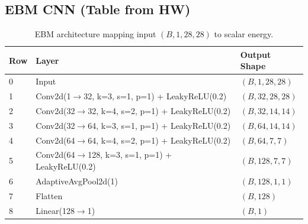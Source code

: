 \documentclass[a4paper,12pt]{article}
\begin{document}
\subsection{EBM CNN (Table from HW)}
\begin{table}[H]
\centering
\caption{EBM architecture mapping input $(B,1,28,28)$ to scalar energy.}
\begin{tabular}{lll}
\toprule
Row & Layer & Output Shape \\
\midrule
0 & Input & $(B,1,28,28)$ \\
1 & Conv2d(1$\rightarrow$32, k=3, s=1, p=1) + LeakyReLU(0.2) & $(B,32,28,28)$ \\
2 & Conv2d(32$\rightarrow$32, k=4, s=2, p=1) + LeakyReLU(0.2) & $(B,32,14,14)$ \\
3 & Conv2d(32$\rightarrow$64, k=3, s=1, p=1) + LeakyReLU(0.2) & $(B,64,14,14)$ \\
4 & Conv2d(64$\rightarrow$64, k=4, s=2, p=1) + LeakyReLU(0.2) & $(B,64,7,7)$ \\
5 & Conv2d(64$\rightarrow$128, k=3, s=1, p=1) + LeakyReLU(0.2) & $(B,128,7,7)$ \\
6 & AdaptiveAvgPool2d(1) & $(B,128,1,1)$ \\
7 & Flatten & $(B,128)$ \\
8 & Linear(128$\rightarrow$1) & $(B,1)$ \\
\bottomrule
\end{tabular}
\end{table}
\end{document}
